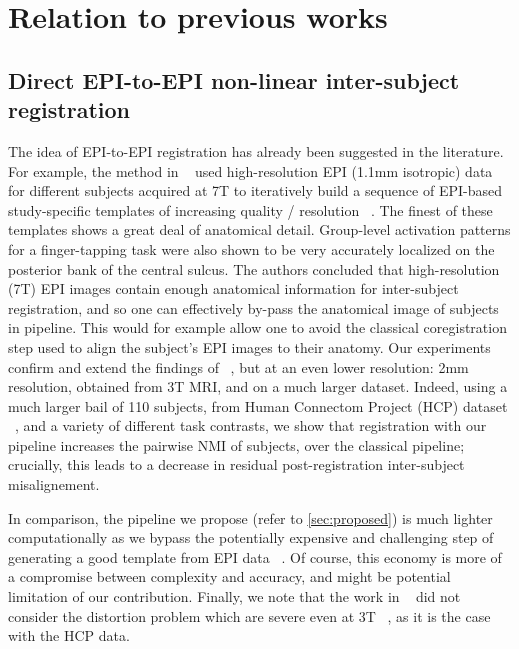 \section{Relation to previous  works}
\subsection{Direct EPI-to-EPI non-linear inter-subject  registration}
The idea of EPI-to-EPI registration has already been suggested in the
literature. For example, the method in ~\citep{grabner2014} used
high-resolution EPI (1.1mm isotropic) data for different subjects
acquired at 7T to iteratively build a sequence of EPI-based
study-specific templates of increasing quality / resolution
~\citep{pmid17354756}. The finest of these templates shows a great deal
of anatomical detail. Group-level activation patterns for a
finger-tapping task were also shown to be very accurately localized on
the posterior bank of the central sulcus. The authors concluded that
high-resolution (7T) EPI images contain enough anatomical information
for inter-subject registration, and so one can effectively by-pass the
anatomical image of subjects in pipeline. This would for example allow
one to avoid the classical coregistration step used to align the
subject's EPI images to their anatomy.  Our experiments confirm and
extend the findings of ~\citep{grabner2014}, but at an even lower
resolution: 2mm resolution, obtained from 3T MRI, and on a much larger
dataset. Indeed, using a much larger bail of 110 subjects, from Human
Connectom Project (HCP) dataset ~\citep{VanEssen20122222}, and a variety
of different task contrasts, we show that registration with our
pipeline increases the pairwise NMI of subjects, over the classical
pipeline; crucially, this leads to a decrease in residual
post-registration inter-subject misalignement.


In comparison, the pipeline we propose (refer to \ref{sec:proposed})
is much lighter computationally as
we bypass the potentially expensive and challenging step of generating a good
template from EPI data ~\citep{pmid17354756}. Of course, this economy is
more of a compromise between complexity and accuracy, and might be potential
limitation of our
contribution.  Finally, we note that the work in ~\citep{grabner2014}
did not consider the distortion problem which are severe even at 3T
~\citep{anderson2003}, as it is the case with the HCP data.

